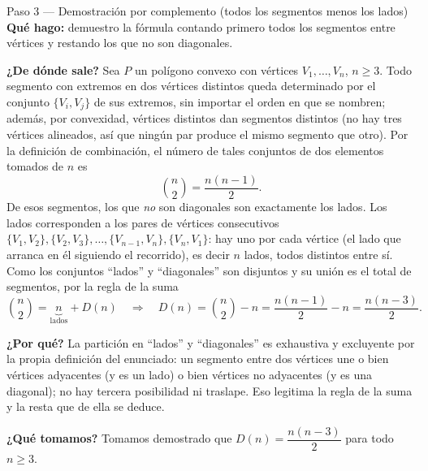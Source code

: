 \documentclass[11pt]{article}
\begin{document}
\begin{paso}{Paso 3 --- Demostración por complemento (todos los segmentos menos los lados)}
\textbf{Qué hago:} demuestro la fórmula contando primero todos los segmentos entre vértices y
restando los que no son diagonales.

\textbf{¿De dónde sale?} Sea $P$ un polígono convexo con vértices $V_1,\dots ,V_n$, $n\ge 3$. Todo
segmento con extremos en dos vértices distintos queda determinado por el conjunto $\{V_i,V_j\}$ de sus
extremos, sin importar el orden en que se nombren; además, por convexidad, vértices distintos dan
segmentos distintos (no hay tres vértices alineados, así que ningún par produce el mismo segmento que
otro). Por la definición de combinación, el número de tales conjuntos de dos elementos tomados de $n$
es
\[
\binom{n}{2}=\frac{n(n-1)}{2}.
\]
De esos segmentos, los que \emph{no} son diagonales son exactamente los lados. Los lados corresponden
a los pares de vértices consecutivos $\{V_1,V_2\},\{V_2,V_3\},\dots ,\{V_{n-1},V_n\},\{V_n,V_1\}$: hay
uno por cada vértice (el lado que arranca en él siguiendo el recorrido), es decir $n$ lados, todos
distintos entre sí. Como los conjuntos ``lados'' y ``diagonales'' son disjuntos y su unión es el
total de segmentos, por la regla de la suma
\[
\binom{n}{2}=\underbrace{n}_{\text{lados}}+D(n)
\quad\Longrightarrow\quad
D(n)=\binom{n}{2}-n=\frac{n(n-1)}{2}-n=\frac{n(n-3)}{2}.
\]

\textbf{¿Por qué?} La partición en ``lados'' y ``diagonales'' es exhaustiva y excluyente por la propia
definición del enunciado: un segmento entre dos vértices une o bien vértices adyacentes (y es un lado)
o bien vértices no adyacentes (y es una diagonal); no hay tercera posibilidad ni traslape. Eso
legitima la regla de la suma y la resta que de ella se deduce.

\textbf{¿Qué tomamos?} Tomamos demostrado que $D(n)=\dfrac{n(n-3)}{2}$ para todo $n\ge 3$.
\end{paso}
\end{document}
